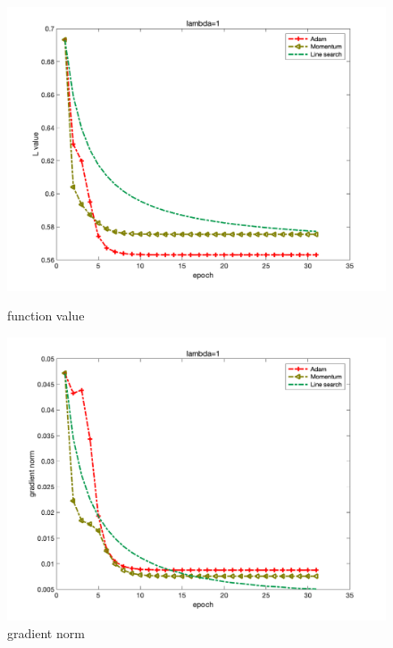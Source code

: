 \documentclass{article}
\begin{document}
\begin{figure}[H]
	\begin{minipage}{0.33\linewidth}
		\centering
		\includegraphics[width=1\linewidth]{./fig/fval_c2}
		\caption{function value}
	\end{minipage}
	\begin{minipage}{0.33\linewidth}
		\centering
		\includegraphics[width=1\linewidth]{./fig/gnorm_c2}
		\caption{gradient norm}
	\end{minipage}
	\begin{minipage}{0.33\linewidth}
		\centering

\end{minipage}
\end{figure}
\end{document}
